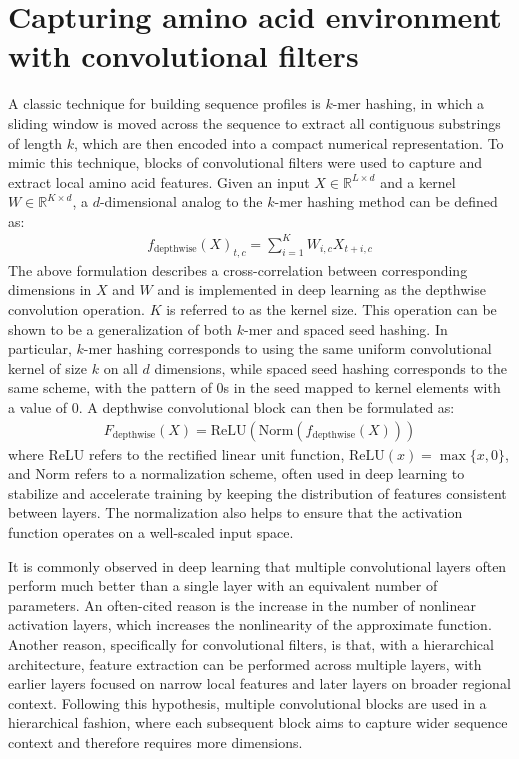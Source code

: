 \documentclass[twoside,a4paper]{master}
\begin{document}
\section{Capturing amino acid environment with convolutional filters}
A classic technique for building sequence profiles is \(k\)-mer hashing, in which a sliding window is moved across the sequence to extract all contiguous substrings of length \(k\), which are then encoded into a compact numerical representation. To mimic this technique, blocks of convolutional filters were used to capture and extract local amino acid features. Given an input \(X \in \mathbb{R}^{L\times d}\) and a kernel \(W\in \mathbb{R}^{K\times d}\), a \(d\)-dimensional analog to the \(k\)-mer hashing method can be defined as:
\begin{align}
    f_{\text{depthwise}}(X)_{t,c} = \sum_{i=1}^K W_{i,c} X_{t+i,c}
\end{align}
The above formulation describes a cross-correlation between corresponding dimensions in \(X\) and \(W\) and is implemented in deep learning as the depthwise convolution operation. \(K\) is referred to as the kernel size. This operation can be shown to be a generalization of both \(k\)-mer and spaced seed hashing. In particular, \(k\)-mer hashing corresponds to using the same uniform convolutional kernel of size \(k\) on all \(d\) dimensions, while spaced seed hashing corresponds to the same scheme, with the pattern of 0s in the seed mapped to kernel elements with a value of 0. A depthwise convolutional block can then be formulated as:
\begin{align}
    F_{\text{depthwise}}(X) = \text{ReLU}(\text{Norm}(f_{\text{depthwise}}(X)))
\end{align}
where ReLU refers to the rectified linear unit function, \(\text{ReLU}(x)=\max \{x, 0\}\), and Norm refers to a normalization scheme, often used in deep learning to stabilize and accelerate training by keeping the distribution of features consistent between layers. The normalization also helps to ensure that the activation function operates on a well-scaled input space.

It is commonly observed in deep learning that multiple convolutional layers often perform much better than a single layer with an equivalent number of parameters. An often-cited reason is the increase in the number of nonlinear activation layers, which increases the nonlinearity of the approximate function. Another reason, specifically for convolutional filters, is that, with a hierarchical architecture, feature extraction can be performed across multiple layers, with earlier layers focused on narrow local features and later layers on broader regional context. Following this hypothesis, multiple convolutional blocks are used in a hierarchical fashion, where each subsequent block aims to capture wider sequence context and therefore requires more dimensions.
\end{document}
